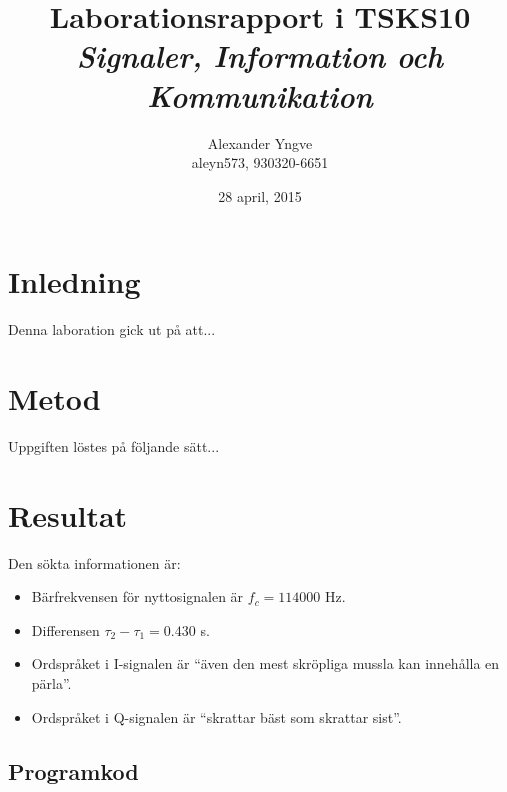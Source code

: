 \documentclass[10pt,twocolumn]{article}
\title{Laborationsrapport i TSKS10 \emph{Signaler, Information och Kommunikation}}
\author{Alexander Yngve\\aleyn573, 930320-6651}
\date{28 april, 2015}
\begin{document}
\begin{figure}
  
\end{figure}

\maketitle

\clearpage

\section{Inledning}

Denna laboration gick ut på att...

\section{Metod}

Uppgiften löstes på följande sätt...

\section{Resultat}

Den sökta informationen är:
\begin{itemize}
\item Bärfrekvensen för nyttosignalen är $f_c = 114000$ Hz.
\item Differensen $\tau_{2} - \tau_{1} = 0.430$ s.
\item Ordspråket i I-signalen är ``även den mest skröpliga mussla kan innehålla en pärla''.
\item Ordspråket i Q-signalen är ``skrattar bäst som skrattar sist''.
\end{itemize}

\clearpage

\begin{appendices}
\section{Programkod}

\end{appendices}
\end{document}
